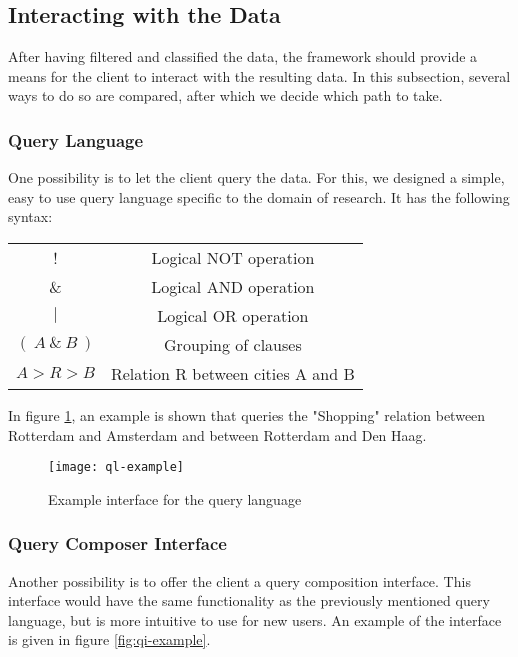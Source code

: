 \subsection{Interacting with the Data}
After having filtered and classified the data, the framework should provide a means for the client to interact with the resulting data. In this subsection, several ways to do so are compared, after which we decide which path to take.

\subsubsection{Query Language}

One possibility is to let the client query the data. For this, we designed a simple, easy to use query language specific to the domain of research. It has the following syntax:

\begin{center}
\begin{tabular}{ |c|c| } 
 \hline
 ! & Logical NOT operation \\
 \& & Logical AND operation \\ 
 $|$ & Logical OR operation \\ 
 $(~A~\&~B~)$ & Grouping of clauses \\
 $A > R > B$ & Relation R between cities A and B \\
 \hline
\end{tabular}
\end{center}

In figure \ref{fig:ql-example}, an example is shown that queries the "Shopping" relation between Rotterdam and Amsterdam and between Rotterdam and Den Haag.

\begin{figure}[ht]
\centering
\texttt{[image: ql-example]}
\caption{Example interface for the query language}
\label{fig:ql-example}
\end{figure}

\subsubsection{Query Composer Interface}

Another possibility is to offer the client a query composition interface. This interface would have the same functionality as the previously mentioned query language, but is more intuitive to use for new users. An example of the interface is given in figure \ref{fig:qi-example}.

